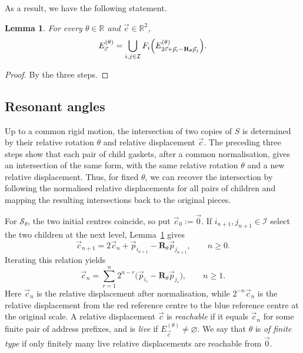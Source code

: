 \documentclass[scheme=plain]{ctexart}
\newtheorem{lemma}[theorem]{Lemma}
\begin{document}
As a result, we have the following statement.

\begin{lemma}
\label{lem:carry-recursion-general}
For every $\theta\in\mathbb R$ and $\vec c\in\mathbb R^2$,
\[
E_{\vec c}^{(\theta)}
=\bigcup_{i,j\in\mathcal I}
F_i\Bigl(E_{2\vec c+\vec p_i-\mathbf R_\theta\vec p_j}^{(\theta)}\Bigr).
\]
\end{lemma}
\begin{proof}
    By the three steps.
\end{proof}







\subsection{Resonant angles}
\label{sec:commensurable}

Up to a common rigid motion, the intersection of two copies of $S$ is
determined by their relative rotation $\theta$ and relative displacement $\vec c$.
The preceding three steps show that each pair of child gaskets, after a common
normalisation, gives an intersection of the same form, with the same relative
rotation $\theta$ and a new relative displacement.
Thus, for fixed $\theta$, we can recover the intersection by following the
normalised relative displacements for all pairs of children and mapping the
resulting intersections back to the original pieces.

For $\mathcal S_\theta$, the two initial centres coincide, so put
$\vec c_0:=\vec{0}$.
If $i_{n+1},j_{n+1}\in\mathcal I$ select the two children at the next level,
Lemma~\ref{lem:carry-recursion-general} gives
\begin{equation}
\vec c_{n+1}
=2\vec c_n+\vec p_{i_{n+1}}-\mathbf R_\theta\vec p_{j_{n+1}},
\qquad n\geq0.
\label{eq:carry-update}
\end{equation}
Iterating this relation yields
\begin{equation}
\vec c_n=\sum_{r=1}^n2^{n-r}
\bigl(\vec p_{i_r}-\mathbf R_\theta\vec p_{j_r}\bigr),
\qquad n\geq1.
\label{eq:carry-closed-form}
\end{equation}
Here $\vec c_n$ is the relative displacement after normalisation, while
$2^{-n}\vec c_n$ is the relative displacement from the red reference centre
to the blue reference centre at the original scale.
A relative displacement $\vec c$ is \emph{reachable} if it equals $\vec c_n$
for some finite pair of address prefixes, and is \emph{live} if
$E_{\vec c}^{(\theta)}\neq\varnothing$.
We say that $\theta$ is \emph{of finite type} if only finitely many live
relative displacements are reachable from $\vec{0}$.
\end{document}
